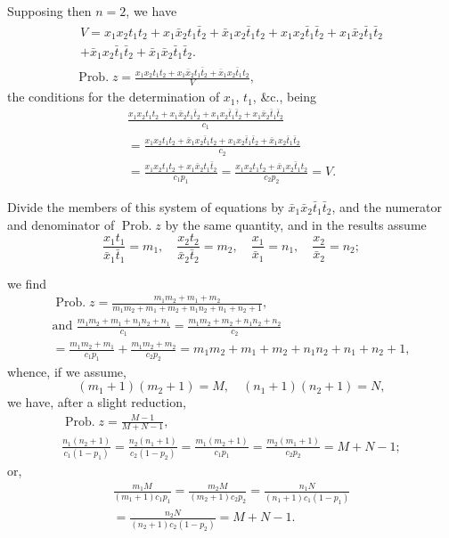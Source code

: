 \documentclass[oneside]{book}
\begin{document}
Supposing then $n = 2$, we have
\begin{gather*}
\begin{split}
V = x_1 x_2 t_1 t_2
+ x_1 \bar{x}_2 t_1 \bar{t}_2
+ \bar{x}_1 x_2 \bar{t}_1 t_2
+ x_1 x_2 \bar{t}_1 \bar{t}_2
+ x_1 \bar{x}_2 \bar{t}_1 \bar{t}_2
\\
+ \bar{x}_1 x_2 \bar{t}_1 \bar{t}_2
+ \bar{x}_1 \bar{x}_2 \bar{t}_1 \bar{t}_2.
\end{split}
\\
\operatorname{Prob. } z
= \frac{x_1 x_2 t_1 t_2
+ x_1 \bar{x}_2 t_1 \bar{t}_2
+ \bar{x}_1 x_2 \bar{t}_1 t_2  }{V},
\end{gather*}
the conditions for the determination of $x_1$, $t_1$, \&c., being
\[
\begin{split}
 \frac{x_1 x_2 t_1 t_2
 + x_1 \bar{x}_2 t_1 \bar{t}_2
 + x_1 x_2 \bar{t}_1 \bar{t}_2
 + x_1 \bar{x}_2 \bar{t}_1 \bar{t}_2}{c_1}
\\
=\frac{x_1 x_2 t_1 t_2
 + \bar{x}_1 x_2 \bar{t}_1 t_2
 + x_1 x_2 \bar{t}_1 \bar{t}_2
 + \bar{x}_1 x_2 \bar{t}_1 \bar{t}_2}{c_2}
\\
=\frac{x_1 x_2 t_1 t_2 + x_1 \bar{x}_2 t_1 \bar{t}_2}{c_1 p_1}
=\frac{x_1 x_2 t_1 t_2 + \bar{x}_1 x_2 \bar{t}_1 t_2}{c_2 p_2} = V.
\end{split}
\]

Divide the members of this system of equations by
$\bar{x}_1 \bar{x}_2 \bar{t}_1 \bar{t}_2$,
and the numerator and denominator of $\operatorname{Prob. } z$ by the same
quantity, and in the results assume
\begin{equation*}\tag{7}
 \frac{x_1 t_1}{\bar{x}_1 \bar{t}_1} = m_1, \quad
 \frac{x_2 t_2}{\bar{x}_2 \bar{t}_2} = m_2, \quad
 \frac{x_1}{\bar{x}_1}=n_1, \quad \frac{x_2}{\bar{x}_2}=n_2;
\end{equation*}

we find
\begin{gather*}
\operatorname{Prob. } z = \frac{m_1 m_2 + m_1 + m_2}{m_1 m_2 + m_1 + m_2 + n_1 n_2 + n_1 + n_2 + 1},\\
\text{and } \frac{m_1 m_2 + m_1 + n_1 n_2 + n_1}{c_1}=\frac{m_1 m_2 + m_2 + n_1 n_2 + n_2}{c_2}
\\
\tag{8}
= \frac{m_1 m_2 + m_1}{c_1 p_1} + \frac{m_1 m_2 + m_2}{c_2 p_2}
=m_1 m_2 + m_1 + m_2 + n_1 n_2 + n_1 + n_2 + 1,
\end{gather*}
whence, if we assume,
\begin{equation*}\tag{9}
(m_1 + 1) (m_2+1)=M, \quad (n_1 + 1) (n_2 + 1) = N,
\end{equation*}
we have, after a slight reduction,
\begin{gather*}
\operatorname{Prob. } z = \frac{M-1}{M+N-1}, \\
\frac{n_1 (n_2 + 1)}{c_1 (1-p_1)} = \frac{n_2 (n_1 + 1)}{c_2 (1-p_2)} = \frac{m_1 (m_2 + 1)}{c_1 p_1} = \frac{m_2 (m_1 + 1)}{c_2 p_2}
=M+N-1;
\end{gather*}
or,
\[
\begin{split}
\frac{m_1 M}{(m_1 + 1)c_1 p_1}=\frac{m_2 M}{(m_2 + 1)c_2 p_2} =\frac{n_1 N}{(n_1 + 1)c_1(1-p_1)}\\
=\frac{n_2 N}{(n_2 + 1)c_2(1-p_2)}=M+N-1.
\end{split}
\]
\end{document}
